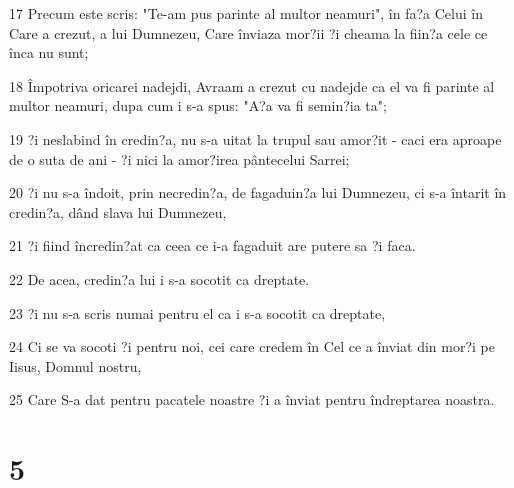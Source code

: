 \par 17 Precum este scris: "Te-am pus parinte al multor neamuri", în fa?a Celui în Care a crezut, a lui Dumnezeu, Care înviaza mor?ii ?i cheama la fiin?a cele ce înca nu sunt;
\par 18 Împotriva oricarei nadejdi, Avraam a crezut cu nadejde ca el va fi parinte al multor neamuri, dupa cum i s-a spus: "A?a va fi semin?ia ta";
\par 19 ?i neslabind în credin?a, nu s-a uitat la trupul sau amor?it - caci era aproape de o suta de ani - ?i nici la amor?irea pântecelui Sarrei;
\par 20 ?i nu s-a îndoit, prin necredin?a, de fagaduin?a lui Dumnezeu, ci s-a întarit în credin?a, dând slava lui Dumnezeu,
\par 21 ?i fiind încredin?at ca ceea ce i-a fagaduit are putere sa ?i faca.
\par 22 De acea, credin?a lui i s-a socotit ca dreptate.
\par 23 ?i nu s-a scris numai pentru el ca i s-a socotit ca dreptate,
\par 24 Ci se va socoti ?i pentru noi, cei care credem în Cel ce a înviat din mor?i pe Iisus, Domnul nostru,
\par 25 Care S-a dat pentru pacatele noastre ?i a înviat pentru îndreptarea noastra.

\chapter{5}

